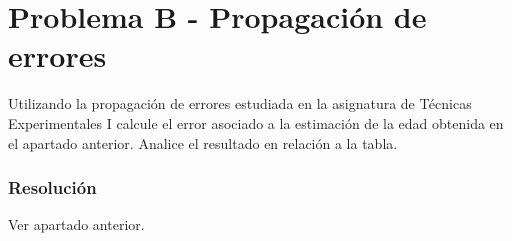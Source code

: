 
\section{Problema B - Propagación de errores}

Utilizando la propagación de errores estudiada en la asignatura de Técnicas
Experimentales I calcule el error asociado a la estimación de la edad obtenida en
el apartado anterior. Analice el resultado en relación a la tabla.


\subsubsection{Resolución}

Ver apartado anterior.